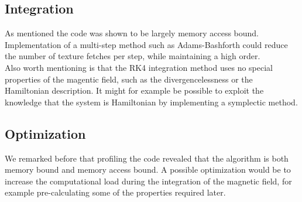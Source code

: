 \documentclass{article}
\begin{document}
\subsection{Integration}
As mentioned the code was shown to be largely memory access bound. Implementation of a multi-step method such as Adams-Bashforth could reduce the number of texture fetches per step, while maintaining a high order.\\
Also worth mentioning is that the RK4 integration method uses no special properties of the magentic field, such as the divergencelessness or the Hamiltonian description. It might for example be possible to exploit the knowledge that the system is Hamiltonian by implementing a symplectic method.

\subsection{Optimization}
We remarked before that profiling the code revealed that the algorithm is both memory bound and memory access bound. A possible optimization would be to increase the computational load during the integration of the magnetic field, for example pre-calculating some of the properties required later.





\end{document}
